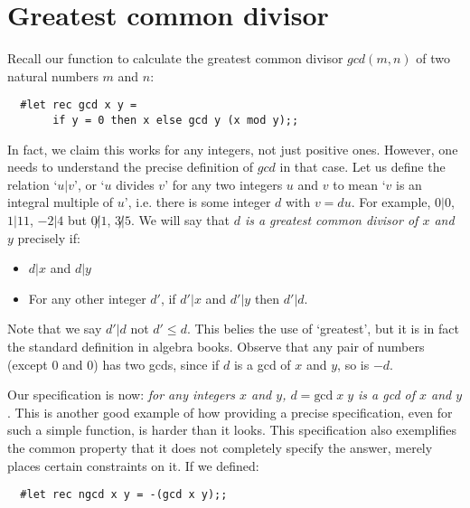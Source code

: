 \section{Greatest common divisor}

Recall our function to calculate the greatest common divisor $gcd(m,n)$ of two
natural numbers $m$ and $n$:

\begin{boxed}\begin{verbatim}
  #let rec gcd x y =
       if y = 0 then x else gcd y (x mod y);;
\end{verbatim}\end{boxed}

In fact, we claim this works for any integers, not just positive ones. However,
one needs to understand the precise definition of $gcd$ in that case. Let us
define the relation `$u | v$', or `$u$ divides $v$' for any two integers $u$
and $v$ to mean `$v$ is an integral multiple of $u$', i.e. there is some
integer $d$ with $v = d u$. For example, $0 | 0$, $1 | 11$, $-2 | 4$ but $0
\not| 1$, $3 \not| 5$. We will say that {\em $d$ is a greatest common divisor
of $x$ and $y$} precisely if:

\begin{itemize}

\item $d | x$ and $d | y$

\item For any other integer $d'$, if $d' | x$ and $d' | y$ then $d' | d$.

\end{itemize}

Note that we say $d' | d$ not $d' \leq d$. This belies the use of `greatest',
but it is in fact the standard definition in algebra books. Observe that any
pair of numbers (except $0$ and $0$) has two gcds, since if $d$ is a gcd of $x$
and $y$, so is $-d$.

Our specification is now: {\em for any integers $x$ and $y$, $d = \mbox{gcd}\;
x\; y$ is a gcd of $x$ and $y$}. This is another good example of how providing
a precise specification, even for such a simple function, is harder than it
looks. This specification also exemplifies the common property that it does not
completely specify the answer, merely places certain constraints on it. If we
defined:

\begin{boxed}\begin{verbatim}
  #let rec ngcd x y = -(gcd x y);;
\end{verbatim}\end{boxed}

